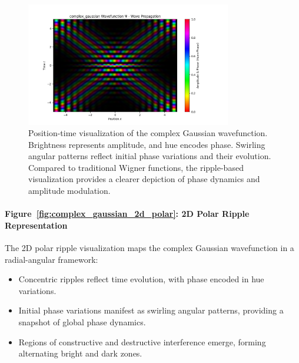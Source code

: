 \documentclass[12pt]{article}
\begin{document}
\begin{figure}[H]
    \centering
    \includegraphics[width=0.8\textwidth]{images/complex_gaussian_wavefunction_probability_density_with_phase.png}
    \caption{Position-time visualization of the complex Gaussian wavefunction. Brightness represents amplitude, and hue encodes phase. Swirling angular patterns reflect initial phase variations and their evolution. Compared to traditional Wigner functions, the ripple-based visualization provides a clearer depiction of phase dynamics and amplitude modulation.}
    \label{fig:complex_gaussian_xt}
\end{figure}

\paragraph{Figure~\ref{fig:complex_gaussian_2d_polar}: 2D Polar Ripple Representation}
The 2D polar ripple visualization maps the complex Gaussian wavefunction in a radial-angular framework:
\begin{itemize}
    \item Concentric ripples reflect time evolution, with phase encoded in hue variations.
    \item Initial phase variations manifest as swirling angular patterns, providing a snapshot of global phase dynamics.
    \item Regions of constructive and destructive interference emerge, forming alternating bright and dark zones.
\end{itemize}
\end{document}
